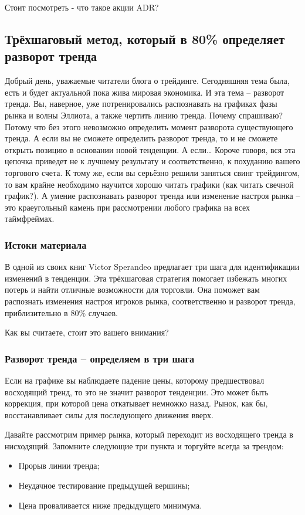 \documentclass[a5paper]{article}
\begin{document}
Стоит посмотреть - что такое акции ADR?

\subsection{Трёхшаговый метод, который в 80\% определяет разворот
  тренда}

Добрый день, уважаемые читатели блога о трейдинге. Сегодняшняя тема
была, есть и будет актуальной пока жива мировая экономика. И эта тема
– разворот тренда. Вы, наверное, уже потренировались распознавать на
графиках фазы рынка и волны Эллиота, а также чертить линию
тренда. Почему спрашиваю? Потому что без этого невозможно определить
момент разворота существующего  тренда. А если вы не сможете
определить разворот тренда, то и не сможете открыть позицию в
основании новой тенденции. А если… Короче говоря, вся эта цепочка
приведет не к лучшему результату и соответственно, к похуданию вашего
торгового счета. К тому же, если вы серьёзно решили заняться свинг
трейдингом, то вам крайне необходимо научится хорошо читать графики
(как читать свечной график?). А умение распознавать разворот тренда
или изменение настроя рынка – это краеугольный камень при рассмотрении
любого графика на всех таймфреймах.

\subsubsection{Истоки материала}

В одной из своих книг Victor Sperandeo предлагает три шага для идентификации изменений в тенденции. Эта трёхшаговая стратегия помогает избежать многих потерь и найти отличные возможности для торговли. Она поможет вам распознать изменения настроя игроков рынка, соответственно и разворот тренда, приблизительно в 80\% случаев.

Как вы считаете, стоит это вашего внимания?

\subsubsection{Разворот тренда – определяем в три шага}

Если на графике вы наблюдаете падение цены, которому предшествовал восходящий тренд, то это не значит разворот тенденции. Это может быть коррекция, при которой цена откатывает немножко назад. Рынок, как бы, восстанавливает силы для последующего движения вверх.

Давайте рассмотрим пример рынка, который переходит из восходящего тренда в нисходящий. Запомните следующие три пункта и торгуйте всегда за трендом:
\begin{itemize}
\item     Прорыв линии тренда;
\item     Неудачное тестирование предыдущей вершины;
\item     Цена проваливается ниже предыдущего минимума.
\end{itemize}
\end{document}
